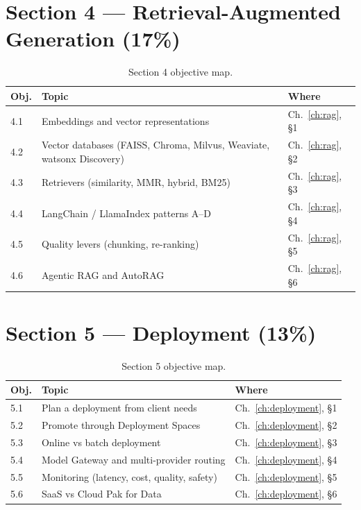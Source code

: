 \section*{Section 4 --- Retrieval-Augmented Generation (17\%)}

\begin{table}[h]
\centering
\small
\begin{tabularx}{\textwidth}{l X l}
\toprule
\textbf{Obj.} & \textbf{Topic} & \textbf{Where} \\
\midrule
4.1 & Embeddings and vector representations       & Ch.~\ref{ch:rag}, \S 1 \\
4.2 & Vector databases (FAISS, Chroma, Milvus, Weaviate, watsonx Discovery) & Ch.~\ref{ch:rag}, \S 2 \\
4.3 & Retrievers (similarity, MMR, hybrid, BM25)  & Ch.~\ref{ch:rag}, \S 3 \\
4.4 & LangChain / LlamaIndex patterns A--D        & Ch.~\ref{ch:rag}, \S 4 \\
4.5 & Quality levers (chunking, re-ranking)       & Ch.~\ref{ch:rag}, \S 5 \\
4.6 & Agentic RAG and AutoRAG                     & Ch.~\ref{ch:rag}, \S 6 \\
\bottomrule
\end{tabularx}
\caption{Section 4 objective map.}
\end{table}

\section*{Section 5 --- Deployment (13\%)}

\begin{table}[h]
\centering
\small
\begin{tabularx}{\textwidth}{l X l}
\toprule
\textbf{Obj.} & \textbf{Topic} & \textbf{Where} \\
\midrule
5.1 & Plan a deployment from client needs                 & Ch.~\ref{ch:deployment}, \S 1 \\
5.2 & Promote through Deployment Spaces                   & Ch.~\ref{ch:deployment}, \S 2 \\
5.3 & Online vs batch deployment                          & Ch.~\ref{ch:deployment}, \S 3 \\
5.4 & Model Gateway and multi-provider routing            & Ch.~\ref{ch:deployment}, \S 4 \\
5.5 & Monitoring (latency, cost, quality, safety)         & Ch.~\ref{ch:deployment}, \S 5 \\
5.6 & SaaS vs Cloud Pak for Data                          & Ch.~\ref{ch:deployment}, \S 6 \\
\bottomrule
\end{tabularx}
\caption{Section 5 objective map.}
\end{table}

